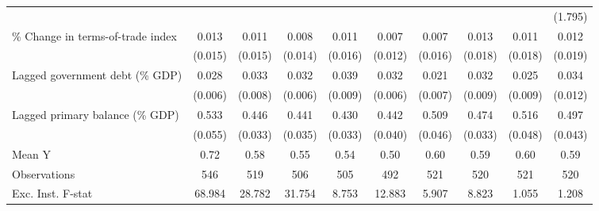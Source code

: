 {\begin{tabular}{l*{9}{c}}
                    &                     &                     &                     &                     &                     &                     &                     &                     &     (1.795)         \\
\addlinespace
\% Change in terms-of-trade index&       0.013         &       0.011         &       0.008         &       0.011         &       0.007         &       0.007         &       0.013         &       0.011         &       0.012         \\
                    &     (0.015)         &     (0.015)         &     (0.014)         &     (0.016)         &     (0.012)         &     (0.016)         &     (0.018)         &     (0.018)         &     (0.019)         \\
\addlinespace
Lagged government debt (\% GDP)&       0.028\sym{***}&       0.033\sym{***}&       0.032\sym{***}&       0.039\sym{***}&       0.032\sym{***}&       0.021\sym{***}&       0.032\sym{***}&       0.025\sym{***}&       0.034\sym{***}\\
                    &     (0.006)         &     (0.008)         &     (0.006)         &     (0.009)         &     (0.006)         &     (0.007)         &     (0.009)         &     (0.009)         &     (0.012)         \\
\addlinespace
Lagged primary balance (\% GDP)&       0.533\sym{***}&       0.446\sym{***}&       0.441\sym{***}&       0.430\sym{***}&       0.442\sym{***}&       0.509\sym{***}&       0.474\sym{***}&       0.516\sym{***}&       0.497\sym{***}\\
                    &     (0.055)         &     (0.033)         &     (0.035)         &     (0.033)         &     (0.040)         &     (0.046)         &     (0.033)         &     (0.048)         &     (0.043)         \\
\midrule
Mean Y              &        0.72         &        0.58         &        0.55         &        0.54         &        0.50         &        0.60         &        0.59         &        0.60         &        0.59         \\
Observations        &         546         &         519         &         506         &         505         &         492         &         521         &         520         &         521         &         520         \\
Exc. Inst. F-stat   &      68.984         &      28.782         &      31.754         &       8.753         &      12.883         &       5.907         &       8.823         &       1.055         &       1.208         \\
\bottomrule
\end{tabular}
}
